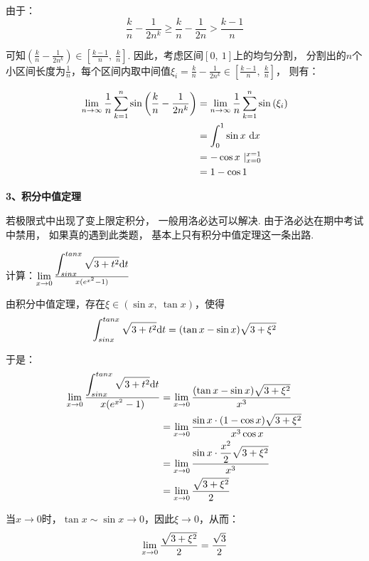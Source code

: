 \begin{solution}
由于：
$$
\frac{k}{n} - \frac{1}{2n^k} \ge \frac{k}{n} - \frac{1}{2n} > \frac{k-1}{n}
$$\par

可知$\left(  \frac{k}{n} - \frac{1}{2n^k} \right)  \in \left[ \frac{k-1}{n},~\frac{k}{n} \right]$. 因此，考虑区间$[0,~1]$上的均匀分割，
分割出的$n$个小区间长度为$\frac{1}{n}$，每个区间内取中间值$\xi_{i} =  \frac{k}{n} - \frac{1}{2n^k} \in \left[ \frac{k-1}{n},~\frac{k}{n} \right]$，
则有：

\begin{equation}
    \begin{aligned}
        \lim\limits_{n \to \infty} \frac{1}{n} \sum_{k=1}^{n} \sin \left( \frac{k}{n} - \frac{1}{2n^k} \right)
        &= \lim\limits_{n \to \infty} \frac{1}{n} \sum_{k=1}^{n} \sin \left( \xi_{i} \right) \\
        &= \int_{0}^{1} \sin x ~\mathrm{d} x \\
        &= -\cos x ~|_{x=0}^{x=1} \\
        &= 1-\cos 1
        \nonumber
    \end{aligned}
\end{equation}
\end{solution}

\textbf{3、积分中值定理}\vspace{0.25em}

若极限式中出现了变上限定积分，
一般用洛必达可以解决.
由于洛必达在期中考试中禁用，
如果真的遇到此类题，
基本上只有积分中值定理这一条出路.

\begin{example}
\label{ex:ch02-18}
计算：$\limx0\frac{\displaystyle\int_{sinx}^{tanx}\sqrt{3+t^{2}}\d{t}}{x(e^{x^2}-1)}$
\end{example}

\begin{solution}
由积分中值定理，存在$\xi \in (\sin x,~\tan x)$，使得
$$
\displaystyle\int_{sinx}^{tanx}\sqrt{3+t^{2}}\mathrm{d}{t} =
(\tan x- \sin x)\sqrt{3+\xi^{2}}
$$\par

于是：
\begin{equation}
    \begin{aligned}
        \limx0\displaystyle\frac{\displaystyle\int_{sinx}^{tanx}\sqrt{3+t^{2}}\d{t}}{x(e^{x^2}-1)}
        &= \limx0\displaystyle\frac{(\tan x- \sin x)\sqrt{3+\xi^{2}}}{x^{3}}\\
        &= \limx0\displaystyle\frac{\sin x\cdot (1-\cos x)\sqrt{3+\xi^{2}}}{x^{3}\cos x}\\
        &= \limx0\displaystyle\frac{\sin x\cdot \displaystyle\frac{x^2}{2}\sqrt{3+\xi^{2}}}{x^{3}}\\
        &= \limx0\frac{\sqrt{3+\xi^{2}}}{2}
        \nonumber
    \end{aligned}
\end{equation} \par
当$x \to 0$时，$\tan x \sim \sin x \to 0$，因此$\xi \to 0$，从而：
\begin{equation}
    \begin{aligned}
        \limx0\frac{\sqrt{3+\xi^{2}}}{2} = \frac{\sqrt{3}}{2}
        \nonumber
    \end{aligned}
\end{equation}
\end{solution}
